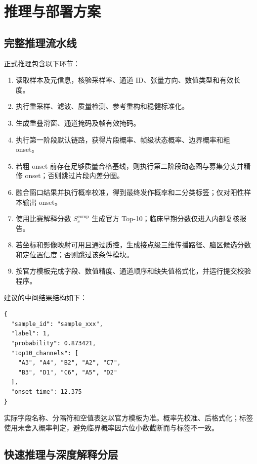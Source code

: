 \clearpage
\section{推理与部署方案}

\subsection{完整推理流水线}

正式推理包含以下环节：

\begin{enumerate}[leftmargin=2.6em,itemsep=0.2em]
    \item 读取样本及元信息，核验采样率、通道 ID、张量方向、数值类型和有效长度。
    \item 执行重采样、滤波、质量检测、参考重构和稳健标准化。
    \item 生成重叠滑窗、通道掩码及帧有效掩码。
    \item 执行第一阶段默认链路，获得片段概率、帧级状态概率、边界概率和粗 onset。
    \item 若粗 onset 前存在足够质量合格基线，则执行第二阶段动态图与募集分支并精修 onset；否则跳过片段内差分图。
    \item 融合窗口结果并执行概率校准，得到最终发作概率和二分类标签；仅对阳性样本输出 onset。
    \item 使用比赛解释分数 $S_c^{\mathrm{comp}}$ 生成官方 Top-10；临床早期分数仅进入内部复核报告。
    \item 若坐标和影像映射可用且通过质控，生成接点级三维传播路径、脑区候选分数和定位置信度；否则跳过该条件模块。
    \item 按官方模板完成字段、数值精度、通道顺序和缺失值格式化，并运行提交校验程序。
\end{enumerate}

建议的中间结果结构如下：

\begin{verbatim}
{
  "sample_id": "sample_xxx",
  "label": 1,
  "probability": 0.873421,
  "top10_channels": [
    "A3", "A4", "B2", "A2", "C7",
    "B3", "D1", "C6", "A5", "D2"
  ],
  "onset_time": 12.375
}
\end{verbatim}

实际字段名称、分隔符和空值表达以官方模板为准。概率先校准、后格式化；标签使用未舍入概率判定，避免临界概率因六位小数截断而与标签不一致。

\subsection{快速推理与深度解释分层}

